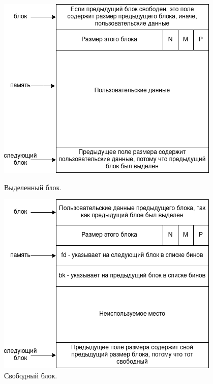 \begin{figure}[!h]
	\begin{minipage}{0.5\textwidth}
		\includegraphics[scale=0.5]{images/glibc-malloc-allocated-chunk.png}
		\caption{Выделенный блок.}
		\label{glibc-malloc-allocated-chunk}
	\end{minipage}
	\begin{minipage}{0.5\textwidth}
		\includegraphics[scale=0.5]{images/glibc-malloc-free-chunk.png}
		\caption{Свободный блок.}
		\label{glibc-malloc-free-chunk}
	\end{minipage}
\end{figure}

